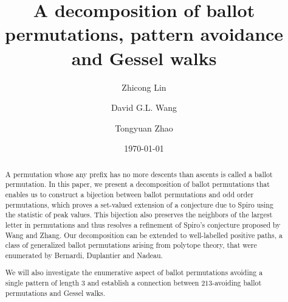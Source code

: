 \documentclass[12pt]{amsart}
\numberwithin{equation}{section}
\theoremstyle{plain}
\theoremstyle{definition}
\begin{document}
\title[A decomposition of ballot permutations]{A decomposition of ballot permutations, pattern avoidance and Gessel walks}




\author[Z. Lin]{Zhicong Lin}
\address[Zhicong Lin]{Research Center for Mathematics and Interdisciplinary Sciences, Shandong University, Qingdao 266237, P.R. China}

\author[D.G.L.~Wang]{David G.L. Wang}
\address[David G.L. Wang]{School of Mathematics and Statistics \& Beijing Key Laboratory on MCAACI, Beijing Institute of Technology, 102488 Beijing, R.R. China}

\author[T. Zhao]{Tongyuan Zhao}
\address[Tongyuan Zhao]{College of Science, China University of Petroleum, 102249 Beijing, P.R. China}

\date{\today}


\begin{abstract}

A permutation whose any prefix has no more descents than ascents is called a ballot permutation. 
In this paper, we present a decomposition of ballot permutations that enables us to 
construct a bijection between ballot permutations and odd order permutations, which proves a set-valued extension of a conjecture due to  Spiro using the statistic of peak values. This bijection also preserves  the neighbors of the largest letter in permutations and thus resolves a refinement of Spiro's conjecture proposed by Wang and Zhang. Our decomposition can be extended to well-labelled positive paths, a class of generalized ballot permutations arising from  polytope theory, that were enumerated by Bernardi,  Duplantier and Nadeau. 

We will also investigate the enumerative aspect of ballot permutations avoiding a single pattern of length $3$ and establish a connection between $213$-avoiding ballot permutations and Gessel walks.
\end{abstract}



\maketitle

\end{document}

